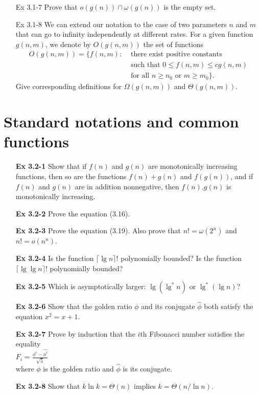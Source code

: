 \documentclass[fontsize=12pt,paper=a4]{book}
\begin{document}
\begin{enumerate}
	\item[Ex 3.1-7]
	Prove that $o(g(n)) \cap \omega(g(n))$ is the empty set.

	\item[Ex 3.1-8]
	We can extend our notation to the case of two parameters $n$ and $m$ that can go to infinity independently at different rates. For a given function $g(n, m)$, we denote by $O(g(n, m))$ the set of functions
	\begin{equation*}
		\begin{split}
			O(g(n, m)) = \{f(n,m) : & \text{ there exist positive constants} \\
			& \text{ such that } 0 \leq f(n,m) \leq cg(n,m) \\ 
			& \text{ for all } n \geq n_0 \text{ or } m \geq m_0 \}.
		\end{split}
	\end{equation*}
	Give corresponding definitions for $\Omega(g(n,m))$ and $\Theta(g(n,m))$.
\end{enumerate}

\section{Standard notations and common functions}

\begin{enumerate}
	\item[\textbf{Ex 3.2-1}]
		Show that if $f(n)$ and $g(n)$ are monotonically increasing functions, then so are the functions $f(n) + g(n)$ and $f(g(n))$, and if $f(n)$ and $g(n)$ are in addition nonnegative, then $f(n) . g(n)$ is monotonically increasing.
		
	\item[\textbf{Ex 3.2-2}]
		Prove the equation (3.16).
		
	\item[\textbf{Ex 3.2-3}]
		Prove the equation (3.19). Also prove that $n! = \omega(2^n)$ and $n! = o(n^n)$.
		
	\item[\textbf{Ex 3.2-4}]
		Is the function $\lceil \lg n \rceil !$ polynomially bounded? Is the function $\lceil \lg \lg n \rceil !$ polynomially bounded?
		
	\item[\textbf{Ex 3.2-5}]
		Which is asymptotically larger: $\lg(\lg^* n)$ or $\lg^*(\lg n)$?
		
	\item[\textbf{Ex 3.2-6}]
		Show that the golden ratio $\phi$ and its conjugate $\hat{\phi}$ both satisfy the equation $x^2 = x + 1$.
		
	\item[\textbf{Ex 3.2-7}]
		Prove by induction that the $i$th Fibonacci number satisfies the equality \\
		$F_i = \frac{\phi^i - \hat{\phi^i}}{\sqrt{5}}$ \\
		where $\phi$ is the golden ratio and $\hat{\phi}$ is its conjugate.
		
	\item[\textbf{Ex 3.2-8}]
		Show that $k \ln k = \Theta(n)$ implies $k=\Theta (n/\ln n)$.
\end{enumerate}
\end{document}
